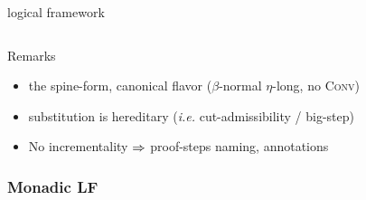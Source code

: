 \documentclass[ignorenonframetext,red]{beamer}
\begin{document}
\begin{frame}{ logical framework }
\begin{onlyenv}
$${        }
        $$
    \begin{block}{Remarks}
      \begin{itemize}
      \item the {spine-form}, \alert{canonical} flavor ($\beta$-normal
        $\eta$-long, no \textsc{Conv})
      \item substitution is \alert{hereditary} (\emph{i.e.}
        cut-admissibility / big-step)
      \item No incrementality $\Rightarrow$ proof-steps naming, annotations
      \end{itemize}
    \end{block}
  \end{onlyenv}
\end{frame}

\subsubsection{Monadic LF}
\end{document}

